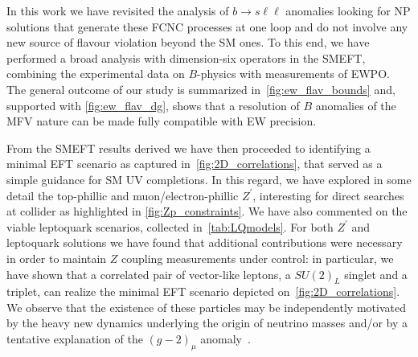 In this work we have revisited the analysis of $b \to s \ell \ell $ anomalies looking for NP solutions that generate these FCNC processes at one loop and do not involve any new source of flavour violation beyond the SM ones. To this end, we have performed a broad analysis with dimension-six operators in the SMEFT, combining the experimental data on $B$-physics with measurements of EWPO. The general outcome of our study is summarized in~\autoref{fig:ew_flav_bounds} and, supported with \autoref{fig:ew_flav_dg}, shows that a resolution of $B$ anomalies of the MFV nature can be made fully compatible with EW precision.

From the SMEFT results derived we have then proceeded to identifying a minimal EFT scenario as captured in~\autoref{fig:2D_correlations}, that served as a simple guidance for SM UV completions. In this regard, we have explored in some detail the top-phillic and muon/electron-phillic $Z^{\prime}$, interesting for direct searches at collider as highlighted in \autoref{fig:Zp_constraints}. We have also commented on the viable leptoquark scenarios, collected in~\autoref{tab:LQmodels}. For both $Z^{\prime}$ and leptoquark solutions we have found that additional contributions  were necessary in order to maintain $Z$ coupling measurements under control:
in particular, we have shown that a correlated pair of vector-like leptons, a $SU(2)_L$ singlet and a triplet, can realize the minimal EFT scenario depicted on~\autoref{fig:2D_correlations}. We observe that the existence of these particles may be independently motivated by the heavy new dynamics underlying the origin of neutrino masses and/or by a tentative explanation of the $(g-2)_{\mu}$ anomaly~\cite{Kannike:2011ng}.

